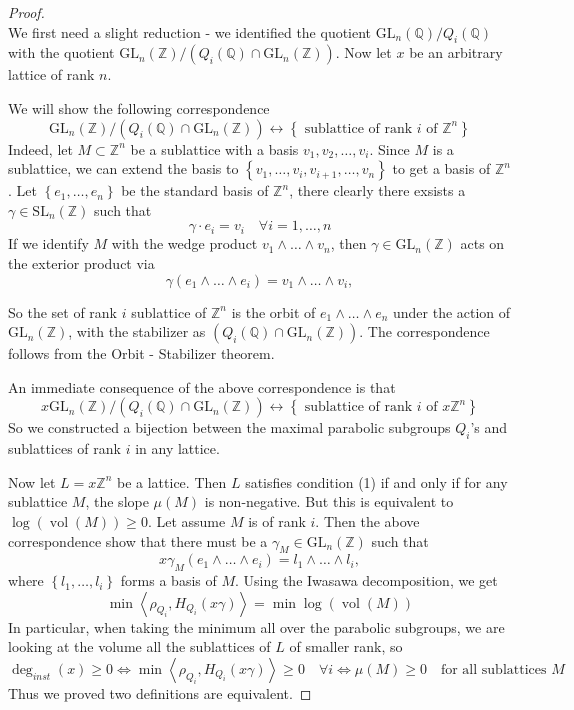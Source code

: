 \documentclass[12pt]{article} %
\DeclareMathOperator{\vol}{vol}
\begin{document}
\begin{proof}
    \hfill \\
    We first need a slight reduction - we identified the quotient $\text{GL}_n(\mathbb{Q})/Q_i(\mathbb{Q})$ with
    the quotient $\text{GL}_n(\mathbb{Z})/(Q_i(\mathbb{Q}) \cap \text{GL}_n(\mathbb{Z})) $. Now let $x$ be an arbitrary lattice of rank $n$.

    We will show the following correspondence
    \[ \text{GL}_n(\mathbb{Z})/(Q_i(\mathbb{Q}) \cap \text{GL}_n(\mathbb{Z})) \longleftrightarrow \left\lbrace \text{ sublattice of rank $i$ of $\mathbb{Z}^n$}\right\rbrace\]
    Indeed, let $M \subset \mathbb{Z}^n$ be a sublattice with a basis $v_1,v_2,\ldots,v_i$. Since $M$ is a sublattice, we can extend the basis to $
        \left\lbrace v_1,\ldots,v_i,v_{i+1},\ldots,v_n\right\rbrace$ to get a basis of $\mathbb{Z}^n$. Let $\left\lbrace e_1,\ldots,e_n\right\rbrace$ be the standard basis
    of $\mathbb{Z}^n$, there clearly there exsists a $\gamma \in \text{SL}_n(\mathbb{Z})$ such that
    \[\gamma \cdot e_i = v_i \quad \forall i =1,\ldots,n\]
    If we identify $M$ with the wedge product $v_1\wedge \ldots \wedge v_n$, then $ \gamma \in \text{GL}_n(\mathbb{Z})$ acts on the exterior product via
    \[\gamma (e_1\wedge \ldots \wedge e_i) = v_1\wedge \ldots \wedge v_i,\]

    So the set of rank $i$ sublattice of $\mathbb{Z}^n$ is the orbit of $e_1\wedge \ldots \wedge e_n$
    under the action of $ \text{GL}_n(\mathbb{Z})$, with the stabilizer as $(Q_i(\mathbb{Q}) \cap \text{GL}_n(\mathbb{Z}))$.
    The correspondence follows from the Orbit - Stabilizer theorem.

    An immediate consequence of the above correspondence is that
    \[ x\text{GL}_n(\mathbb{Z})/(Q_i(\mathbb{Q}) \cap \text{GL}_n(\mathbb{Z})) \longleftrightarrow \left\lbrace \text{ sublattice of rank $i$ of $x\mathbb{Z}^n$}\right\rbrace\]
    So we constructed a bijection between the maximal parabolic subgroups $Q_i$'s and  sublattices of rank $i$ in
    any lattice.

    Now let $L = x\mathbb{Z}^n$  be a lattice. Then $L$ satisfies condition (1) if and only if
    for any sublattice $M$, the slope $\mu(M)$ is non-negative. But this is equivalent to $\log(\vol(M)) \ge 0$.
    Let assume $M$ is of rank $i$. Then the above correspondence show that there must be a $\gamma_M \in \text{GL}_n(\mathbb{Z})$ such that
    \[x\gamma_M(e_1\wedge \ldots\wedge e_i) = l_1\wedge \ldots\wedge l_i,\]
    where $\left\lbrace l_1,\ldots,l_i\right\rbrace$ forms a basis of $M$.
    Using the Iwasawa decomposition, we get
    \[\min\left\langle \rho_{Q_i},H_{Q_i}(x\gamma)\right\rangle = \min\log(\vol(M))\]
    In particular, when taking the minimum all over the parabolic subgroups, we are looking at the volume
    all the sublattices of $L$ of smaller rank, so
    \[\deg_{inst}(x) \ge 0 \Leftrightarrow \min\left\langle \rho_{Q_i},H_{Q_i}(x\gamma)\right\rangle \ge 0  \quad \forall i \Leftrightarrow \mu(M) \ge 0 \quad \text{for all sublattices $M$}\]
    Thus we proved two definitions are equivalent.
\end{proof}
\end{document}
